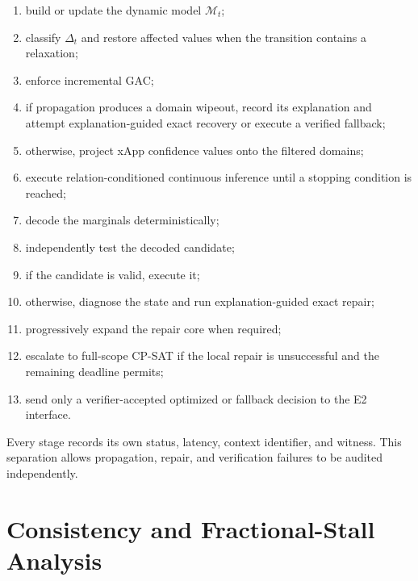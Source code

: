 \documentclass[pdflatex,sn-mathphys-num,iicol,oneside]{sn-jnl}
\begin{document}
\begin{enumerate}
    \item build or update the dynamic model $\mathcal{M}_t$;

    \item classify $\Delta_t$ and restore affected values when the
    transition contains a relaxation;

    \item enforce incremental GAC;

    \item if propagation produces a domain wipeout, record its
    explanation and attempt explanation-guided exact recovery or
    execute a verified fallback;

    \item otherwise, project xApp confidence values onto the filtered
    domains;

    \item execute relation-conditioned continuous inference until a
    stopping condition is reached;

    \item decode the marginals deterministically;

    \item independently test the decoded candidate;

    \item if the candidate is valid, execute it;

    \item otherwise, diagnose the state and run explanation-guided
    exact repair;

    \item progressively expand the repair core when required;

    \item escalate to full-scope CP-SAT if the local repair is
    unsuccessful and the remaining deadline permits;

    \item send only a verifier-accepted optimized or fallback decision
    to the E2 interface.
\end{enumerate}

Every stage records its own status, latency, context identifier, and
witness. This separation allows propagation, repair, and verification
failures to be audited independently.

\section{Consistency and Fractional-Stall Analysis}
\label{sec:analysis}
\end{document}
